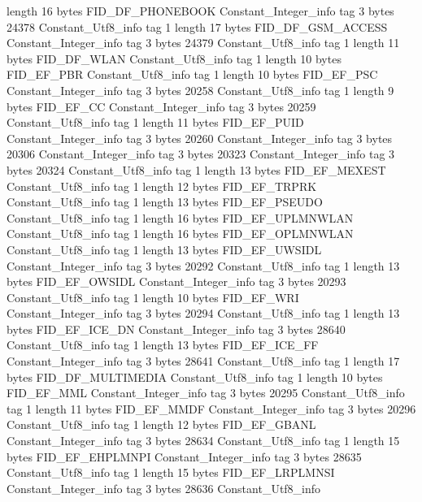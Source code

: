 {{{			length	16
			bytes	FID_DF_PHONEBOOK
		}
		Constant_Integer_info {
			tag	3
			bytes	24378
		}
		Constant_Utf8_info {
			tag	1
			length	17
			bytes	FID_DF_GSM_ACCESS
		}
		Constant_Integer_info {
			tag	3
			bytes	24379
		}
		Constant_Utf8_info {
			tag	1
			length	11
			bytes	FID_DF_WLAN
		}
		Constant_Utf8_info {
			tag	1
			length	10
			bytes	FID_EF_PBR
		}
		Constant_Utf8_info {
			tag	1
			length	10
			bytes	FID_EF_PSC
		}
		Constant_Integer_info {
			tag	3
			bytes	20258
		}
		Constant_Utf8_info {
			tag	1
			length	9
			bytes	FID_EF_CC
		}
		Constant_Integer_info {
			tag	3
			bytes	20259
		}
		Constant_Utf8_info {
			tag	1
			length	11
			bytes	FID_EF_PUID
		}
		Constant_Integer_info {
			tag	3
			bytes	20260
		}
		Constant_Integer_info {
			tag	3
			bytes	20306
		}
		Constant_Integer_info {
			tag	3
			bytes	20323
		}
		Constant_Integer_info {
			tag	3
			bytes	20324
		}
		Constant_Utf8_info {
			tag	1
			length	13
			bytes	FID_EF_MEXEST
		}
		Constant_Utf8_info {
			tag	1
			length	12
			bytes	FID_EF_TRPRK
		}
		Constant_Utf8_info {
			tag	1
			length	13
			bytes	FID_EF_PSEUDO
		}
		Constant_Utf8_info {
			tag	1
			length	16
			bytes	FID_EF_UPLMNWLAN
		}
		Constant_Utf8_info {
			tag	1
			length	16
			bytes	FID_EF_OPLMNWLAN
		}
		Constant_Utf8_info {
			tag	1
			length	13
			bytes	FID_EF_UWSIDL
		}
		Constant_Integer_info {
			tag	3
			bytes	20292
		}
		Constant_Utf8_info {
			tag	1
			length	13
			bytes	FID_EF_OWSIDL
		}
		Constant_Integer_info {
			tag	3
			bytes	20293
		}
		Constant_Utf8_info {
			tag	1
			length	10
			bytes	FID_EF_WRI
		}
		Constant_Integer_info {
			tag	3
			bytes	20294
		}
		Constant_Utf8_info {
			tag	1
			length	13
			bytes	FID_EF_ICE_DN
		}
		Constant_Integer_info {
			tag	3
			bytes	28640
		}
		Constant_Utf8_info {
			tag	1
			length	13
			bytes	FID_EF_ICE_FF
		}
		Constant_Integer_info {
			tag	3
			bytes	28641
		}
		Constant_Utf8_info {
			tag	1
			length	17
			bytes	FID_DF_MULTIMEDIA
		}
		Constant_Utf8_info {
			tag	1
			length	10
			bytes	FID_EF_MML
		}
		Constant_Integer_info {
			tag	3
			bytes	20295
		}
		Constant_Utf8_info {
			tag	1
			length	11
			bytes	FID_EF_MMDF
		}
		Constant_Integer_info {
			tag	3
			bytes	20296
		}
		Constant_Utf8_info {
			tag	1
			length	12
			bytes	FID_EF_GBANL
		}
		Constant_Integer_info {
			tag	3
			bytes	28634
		}
		Constant_Utf8_info {
			tag	1
			length	15
			bytes	FID_EF_EHPLMNPI
		}
		Constant_Integer_info {
			tag	3
			bytes	28635
		}
		Constant_Utf8_info {
			tag	1
			length	15
			bytes	FID_EF_LRPLMNSI
		}
		Constant_Integer_info {
			tag	3
			bytes	28636
		}
		Constant_Utf8_info {
}}}
